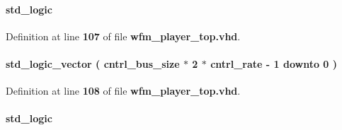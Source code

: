 \paragraph[{wfm\+\_\+player\+\_\+wcmd\+\_\+brst\+\_\+en}]{ {\bfseries \textcolor{comment}{std\+\_\+logic}\textcolor{vhdlchar}{ }} \hspace{0.3cm}{\ttfamily [Signal]}}\label{classwfm__player__top_1_1arch_a58d75e5abc4dc9ed6afd31f6a0917df7}


Definition at line {\bf 107} of file {\bf wfm\+\_\+player\+\_\+top.\+vhd}.

\paragraph[{wfm\+\_\+player\+\_\+wcmd\+\_\+data}]{ {\bfseries \textcolor{comment}{std\+\_\+logic\+\_\+vector}\textcolor{vhdlchar}{ }\textcolor{vhdlchar}{(}\textcolor{vhdlchar}{ }\textcolor{vhdlchar}{ }\textcolor{vhdlchar}{ }\textcolor{vhdlchar}{ }{\bfseries {\bf cntrl\+\_\+bus\+\_\+size}} \textcolor{vhdlchar}{$\ast$}\textcolor{vhdlchar}{ } \textcolor{vhdldigit}{2} \textcolor{vhdlchar}{$\ast$}\textcolor{vhdlchar}{ }\textcolor{vhdlchar}{ }\textcolor{vhdlchar}{ }{\bfseries {\bf cntrl\+\_\+rate}} \textcolor{vhdlchar}{-\/}\textcolor{vhdlchar}{ } \textcolor{vhdldigit}{1} \textcolor{vhdlchar}{ }\textcolor{keywordflow}{downto}\textcolor{vhdlchar}{ }\textcolor{vhdlchar}{ } \textcolor{vhdldigit}{0} \textcolor{vhdlchar}{ }\textcolor{vhdlchar}{)}\textcolor{vhdlchar}{ }} \hspace{0.3cm}{\ttfamily [Signal]}}\label{classwfm__player__top_1_1arch_a5777ab81e7327e437b825ea445b82546}


Definition at line {\bf 108} of file {\bf wfm\+\_\+player\+\_\+top.\+vhd}.

\paragraph[{wfm\+\_\+player\+\_\+wcmd\+\_\+rdy}]{ {\bfseries \textcolor{comment}{std\+\_\+logic}\textcolor{vhdlchar}{ }} \hspace{0.3cm}{\ttfamily [Signal]}}\label{classwfm__player__top_1_1arch_a0f09f8d8fa62733873b0adfd9abe4cb5}


